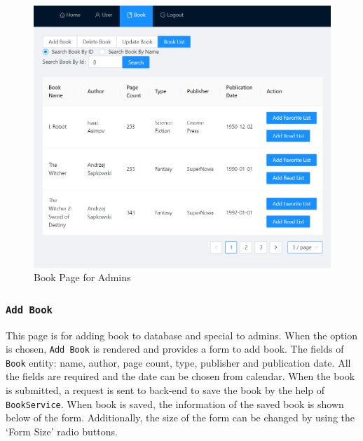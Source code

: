 \begin{minipage}{.49\textwidth}
  \begin{figure}[H]
    \centering
    \includegraphics[width=\linewidth]{img/front-end/book-admin.png}
    \caption{Book Page for Admins}
  \end{figure}
\end{minipage}

\subsubsection{\texttt{Add Book}}

This page is for adding book to database and special to admins. When the option is chosen, \texttt{Add Book} is rendered and provides a form to add book. The fields of \texttt{Book} entity: name, author, page count, type, publisher and publication date. All the fields are required and the date can be chosen from calendar. When the book is submitted, a request is sent to back-end to save the book by the help of \texttt{BookService}. When book is saved, the information of the saved book is shown below of the form. Additionally, the size of the form can be changed by using the `Form Size' radio buttons.

